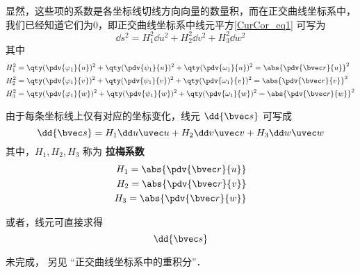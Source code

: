 显然，这些项的系数是各坐标线切线方向向量的数量积，而在正交曲线坐标系中，我们已经知道它们为0，即正交曲线坐标系中线元平方\autoref{CurCor_eq1} 可写为
\begin{equation}
\dd s^2=H_1^2\dd u^2+H_2^2\dd v^2+H_3^2\dd w^2
\end{equation}
其中
\begin{equation}
\begin{aligned}
&H_1^2=\qty(\pdv{\varphi_1}{u})^2+\qty(\pdv{\psi_1}{u})^2+\qty(\pdv{\omega_1}{u})^2=\abs{\pdv{\bvec r}{u}}^2\\
&H_2^2=\qty(\pdv{\varphi_1}{v})^2+\qty(\pdv{\psi_1}{v})^2+\qty(\pdv{\omega_1}{v})^2=\abs{\pdv{\bvec r}{v}}^2\\
&H_3^2=\qty(\pdv{\varphi_1}{w})^2+\qty(\pdv{\psi_1}{w})^2+\qty(\pdv{\omega_1}{w})^2=\abs{\pdv{\bvec r}{w}}^2
\end{aligned}
\end{equation}

由于每条坐标线上仅有对应的坐标变化，线元 $\dd {\bvec s}$ 可写成
\begin{equation}
\dd {\bvec s}=H_1\dd u\uvec u+H_2\dd v\uvec v+H_3\dd w\uvec w
\end{equation}
其中，$H_1,H_2,H_3$ 称为 \textbf{拉梅系数}
\begin{equation}
\begin{aligned}
H_1=\abs{\pdv{\bvec r}{u}}\\
H_2=\abs{\pdv{\bvec r}{v}}\\
H_3=\abs{\pdv{\bvec r}{w}}
\end{aligned}
\end{equation}

或者，线元可直接求得
\begin{equation}
\dd {\bvec s}
\end{equation}

未完成， 另见 “正交曲线坐标系中的重积分”．
